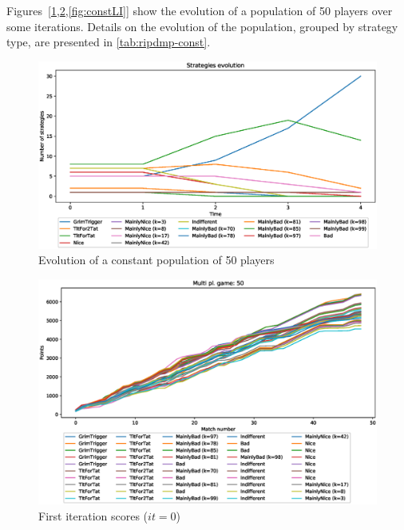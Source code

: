 \documentclass[journal,10pt,twoside]{IEEEtran}
\begin{document}
Figures~[\ref{fig:constR},\ref{fig:constFI},\ref{fig:constLI}] show the evolution of a population of 50 players over some iterations.
Details on the evolution of the population, grouped by strategy type, are presented in \autoref{tab:ripdmp-const}.

\begin{figure}[!ht]
    \centering
    \includegraphics[width=.95\columnwidth]{../img/ripdmp-const/ripdmp-evolution-const-pop-50}
    \caption{Evolution of a constant population of 50 players}
    \label{fig:constR}
\end{figure}

\begin{figure}[!ht]
    \centering
    \includegraphics[width=.95\columnwidth]{../img/ripdmp-const/ripdmp-scores-const-pop-50-r0}
    \caption{First iteration scores ($it=0$)}
    \label{fig:constFI}
\end{figure}
\end{document}
